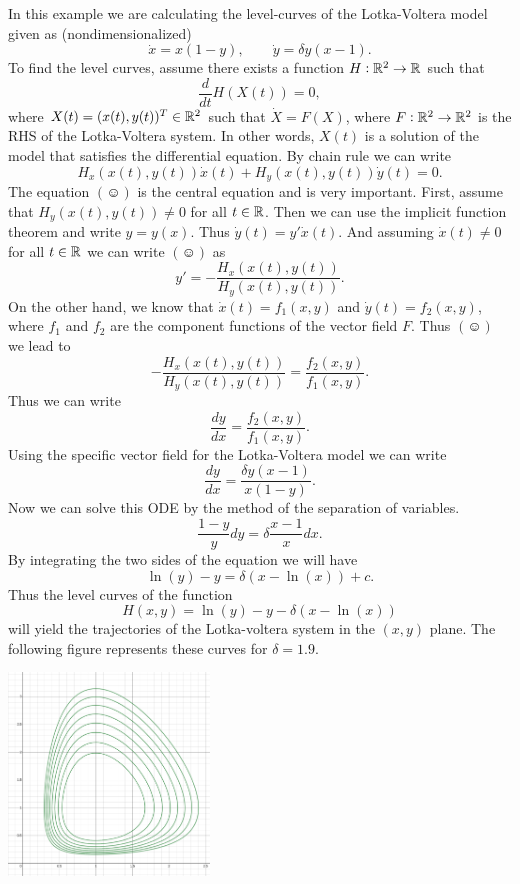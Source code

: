 \begin{example}
	In this example we are calculating the level-curves of the Lotka-Voltera model given as (nondimensionalized)
	\[ \dot{x} = x(1-y), \qquad \dot{y} = \delta y (x-1). \]
	To find the level curves, assume there exists a function $H:\mathbb{R}^2 \to \mathbb{R}$ such that 
	\[ \frac{d}{dt} H(X(t))=0, \]
	where $X(t) = (x(t),y(t))^T \in \mathbb{R}^2$ such that $\dot{X} = F(X)$, where $F:\mathbb{R}^2 \to \mathbb{R}^2$ is the RHS of the Lotka-Voltera system. In other words, $X(t)$ is a solution of the model that satisfies the differential equation. By chain rule we can write
	\[ H_x(x(t), y(t)) \dot{x}(t) + H_y(x(t),y(t)) \dot{y}(t) = 0. \tag{\smiley}  \]
	The equation $(\smiley)$ is the central equation and is very important. First, assume that $H_y(x(t),y(t)) \neq 0$ for all $t\in \mathbb{R}$. Then we can use the implicit function theorem and write $y = y(x)$. Thus $\dot{y}(t) = y' \dot{x}(t)$. And assuming $\dot{x}(t) \neq 0$ for all $t\in \mathbb{R}$ we can write $(\smiley)$ as 
	\[ y' = -\frac{ H_x(x(t), y(t))}{ H_y(x(t), y(t))}. \]
	On the other hand, we know that $\dot{x}(t) = f_1(x,y)$ and $\dot{y}(t) = f_2(x,y)$, where $f_1$ and $f_2$ are the component functions of the vector field $F$. Thus $(\smiley)$ we lead to 
	\[ -\frac{ H_x(x(t), y(t))}{ H_y(x(t), y(t))} = \frac{f_2(x,y)}{f_1(x,y)}.  \]
	Thus we can write
	\[ \frac{dy}{dx} = \frac{f_2(x,y)}{f_1(x,y)}. \]
	Using the specific vector field for the Lotka-Voltera model we can write
	\[ \frac{dy}{dx} = \frac{\delta y(x-1)}{x(1-y)}. \]
	Now we can solve this ODE by the method of the separation of variables.
	\[ \frac{1-y}{y} dy = \delta \frac{x-1}{x} dx. \]
	By integrating the two sides of the equation we will have
	\[ \ln(y) - y = \delta (x - \ln(x)) + c. \]
	Thus the level curves of the function 
	\[ H(x,y) = \ln(y) - y - \delta (x - \ln(x))  \]
	will yield the trajectories of the Lotka-voltera system in the $(x,y)$ plane. The following figure represents these curves for $\delta = 1.9$.
	\begin{center}
		\includegraphics[width=0.4\textwidth]{Images/LotkaVolterraLevelCurves.png}
	\end{center}

\end{example}


